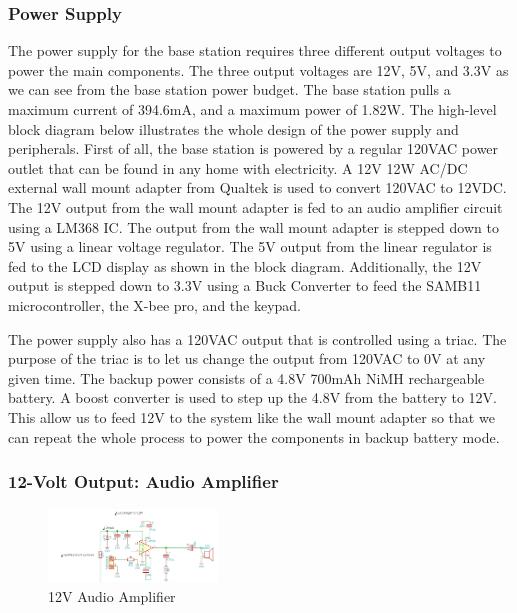 \documentclass[journal,compsoc]{IEEEtran}
\begin{document}
\subsubsection{Power Supply}

The power supply for the base station requires three different output voltages to power the main components. The three output voltages are 12V, 5V, and 3.3V as we can see from the base station power budget. The base station pulls a maximum current of 394.6mA, and a maximum power of 1.82W. The high-level block diagram below illustrates the whole design of the power supply and peripherals. First of all, the base station is powered by a regular 120VAC power outlet that can be found in any home with electricity. A 12V 12W AC/DC external wall mount adapter from Qualtek is used to convert 120VAC to 12VDC. The 12V output from the wall mount adapter is fed to an audio amplifier circuit using a LM368 IC. The output from the wall mount adapter is stepped down to 5V using a linear voltage regulator. The 5V output from the linear regulator is fed to the LCD display as shown in the block diagram. Additionally, the 12V output is stepped down to 3.3V using a Buck Converter to feed the SAMB11 microcontroller, the X-bee pro, and the keypad. 

The power supply also has a 120VAC output that is controlled using a triac. The purpose of the triac is to let us change the output from 120VAC to 0V at any given time. The backup power consists of a 4.8V 700mAh NiMH rechargeable battery. A boost converter is used to step up the 4.8V from the battery to 12V. This allow us to feed 12V to the system like the wall mount adapter so that we can repeat the whole process to power the components in backup battery mode.

\subsubsection{12-Volt Output: Audio Amplifier}

\begin{figure}[ht]	%
\centering
\includegraphics[width=0.4\textwidth]{Audio.png}
\caption{ 12V Audio Amplifier}
\label{Paudio}
\end{figure}
\end{document}
